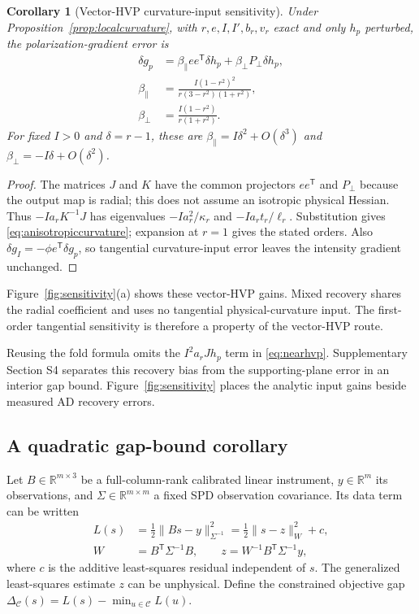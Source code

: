 \documentclass[10pt,a4paper]{article}
\newtheorem{corollary}[theorem]{Corollary}
\begin{document}
\begin{corollary}[Vector-HVP curvature-input sensitivity]
\label{cor:anisotropy}
Under Proposition~\ref{prop:localcurvature}, with $r,e,I,I',b_r,v_r$ exact and only $h_p$ perturbed, the polarization-gradient error is
\begin{equation}
 \begin{aligned}
 \delta g_p&=\beta_{\parallel}ee^{\mathsf T}\delta h_p
             +\beta_{\perp}P_\perp\delta h_p,\\
 \beta_{\parallel}&=\frac{I(1-r^2)^2}{r(3-r^2)(1+r^2)},\\
 \beta_{\perp}&=\frac{I(1-r^2)}{r(1+r^2)}.
 \end{aligned}
 \label{eq:anisotropiccurvature}
\end{equation}
For fixed $I>0$ and $\delta=r-1$, these are $\beta_{\parallel}=I\delta^2+O(\delta^3)$ and $\beta_{\perp}=-I\delta+O(\delta^2)$.
\end{corollary}
\begin{proof}
The matrices $J$ and $K$ have the common projectors $ee^{\mathsf T}$ and $P_\perp$ because the output map is radial; this does not assume an isotropic physical Hessian. Thus $-Ia_rK^{-1}J$ has eigenvalues $-Ia_r^2/\kappa_r$ and $-Ia_rt_r/\ell_r$. Substitution gives \eqref{eq:anisotropiccurvature}; expansion at $r=1$ gives the stated orders. Also $\delta g_I=-\phi e^{\mathsf T}\delta g_p$, so tangential curvature-input error leaves the intensity gradient unchanged.
\end{proof}
Figure~\ref{fig:sensitivity}(a) shows these vector-HVP gains. Mixed recovery shares the radial coefficient and uses no tangential physical-curvature input. The first-order tangential sensitivity is therefore a property of the vector-HVP route.

Reusing the fold formula omits the $I^2a_rJh_p$ term in \eqref{eq:nearhvp}. Supplementary Section S4 separates this recovery bias from the supporting-plane error in an interior gap bound. Figure~\ref{fig:sensitivity} places the analytic input gains beside measured AD recovery errors.




\subsection{A quadratic gap-bound corollary}
\label{sec:gap}
Let $B\in\mathbb R^{m\times3}$ be a full-column-rank calibrated linear instrument, $y\in\mathbb R^m$ its observations, and $\Sigma\in\mathbb R^{m\times m}$ a fixed SPD observation covariance. Its data term can be written
\begin{equation}
 \begin{aligned}
 L(s)&=\tfrac12\|Bs-y\|_{\Sigma^{-1}}^2
       =\tfrac12\|s-z\|_W^2+c,\\
 W&=B^{\mathsf T}\Sigma^{-1}B,\qquad
 z=W^{-1}B^{\mathsf T}\Sigma^{-1}y,
 \end{aligned}
 \label{eq:calibrated}
\end{equation}
where $c$ is the additive least-squares residual independent of $s$. The generalized least-squares estimate $z$ can be unphysical. Define the constrained objective gap $\Delta_{\mathcal C}(s)=L(s)-\min_{u\in\mathcal C}L(u)$.
\end{document}
